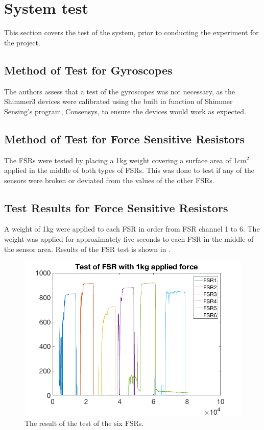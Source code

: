\section{System test}
This section covers the test of the system, prior to conducting the experiment for the project. 

\subsection{Method of Test for Gyroscopes}
The authors assess that a test of the gyroscopes was not necessary, as the Shimmer3 devices were calibrated using the built in function of Shimmer Sensing’s program, Consensys, to ensure the devices would work as expected.



\subsection{Method of Test for Force Sensitive Resistors}
The FSRs were tested by placing a 1kg weight covering a surface area of 1$cm^{2}$ applied in the middle of both types of FSRs. This was done to test if any of the sensors were broken or deviated from the values of the other FSRs. %


\subsection{Test  Results for Force Sensitive Resistors}
A weight of 1kg were applied to each FSR in order from FSR channel 1 to 6. The weight was applied for approximately five seconds to each FSR in the middle of the sensor area. Results of the FSR test is shown in .

\begin{figure}[H]
	\includegraphics[width=.7\textwidth]{figures/FSRTestPlot1kg}
	\caption{The result of the test of the six FSRs.}
	\label{fig:FSRTestPlot1kg}  %
\end{figure}

